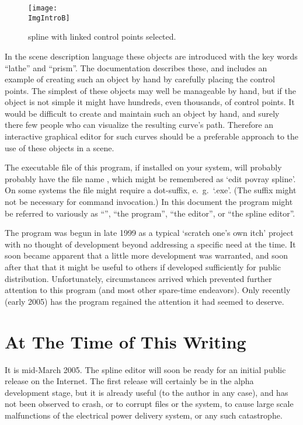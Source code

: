 \begin{figure}[htb]
\centering
\texttt{[image: \\ImgIntroB]}
\caption{\dtybeznu{} spline with linked control points selected.}
\label{fig:bezier_linked_control_points}
\end{figure}

In the \IXpov{} scene description
language these objects are introduced
with the key words ``lathe'' and ``prism''.
The \IXpov{} documentation
describes these, and includes an example of creating such an object
by hand by carefully placing the control points.  The simplest of these
objects may well be manageable by hand, but if the object is not
simple it might have hundreds, even thousands, of control points.
It would be difficult to create and maintain such an object by hand,
and surely there few people who can visualize the resulting curve's
path.  Therefore an interactive graphical editor for such curves
should be a preferable approach to the use of these objects in a
\IXpov{} scene.

The executable file of this program, if installed on your system,
will probably probably have the file name \IXpkg{}, which
might be remembered as `edit povray spline'. On some systems the
file might require a dot-suffix, e.\ g.\ `\dtythispkgname.exe'. (The
suffix might not be necessary for command invocation.) In this document
the program might be referred to variously as ``\dtythispkgname'',
``the program'', ``the editor'', or ``the spline editor''.

The program was begun in late 1999 as a typical `scratch one's own itch'
project with no thought of development beyond addressing a specific
need at the time. It soon became apparent that a little more
development was warranted, and soon after that that it might be
useful to others if developed sufficiently for public distribution.
Unfortunately, circumstances arrived which prevented further attention
to this program (and most other spare-time endeavors). Only recently
(early 2005) has the program regained the attention it had seemed to
deserve.


\section{At The Time of This Writing}%

It is mid-March 2005. The spline editor will soon be ready for
an initial public release on the Internet. The first release will
certainly be in the alpha development stage, but it is already
useful (to the author in any case), and has not been observed to
crash, or to corrupt files or the system, to cause large scale
malfunctions of the electrical power delivery system,
or any such catastrophe.


